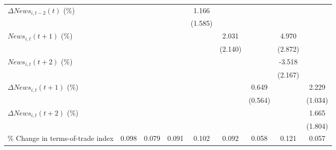 {\begin{tabular}{l*{8}{c}}
\addlinespace
$ \Delta News_{i,t-2}(t)$ (\%)&                     &                     &                     &       1.166         &                     &                     &                     &                     \\
                    &                     &                     &                     &     (1.585)         &                     &                     &                     &                     \\
\addlinespace
$ News_{i,t}(t+1)$ (\%)&                     &                     &                     &                     &       2.031         &                     &       4.970\sym{*}  &                     \\
                    &                     &                     &                     &                     &     (2.140)         &                     &     (2.872)         &                     \\
\addlinespace
$ News_{i,t}(t+2)$ (\%)&                     &                     &                     &                     &                     &                     &      -3.518         &                     \\
                    &                     &                     &                     &                     &                     &                     &     (2.167)         &                     \\
\addlinespace
$ \Delta News_{i,t}(t+1)$ (\%)&                     &                     &                     &                     &                     &       0.649         &                     &       2.229\sym{**} \\
                    &                     &                     &                     &                     &                     &     (0.564)         &                     &     (1.034)         \\
\addlinespace
$ \Delta News_{i,t}(t+2)$ (\%)&                     &                     &                     &                     &                     &                     &                     &       1.665         \\
                    &                     &                     &                     &                     &                     &                     &                     &     (1.804)         \\
\addlinespace
\% Change in terms-of-trade index&       0.098\sym{*}  &       0.079\sym{**} &       0.091\sym{**} &       0.102\sym{**} &       0.092         &       0.058\sym{**} &       0.121\sym{*}  &       0.057\sym{**} \\

\end{tabular}}
